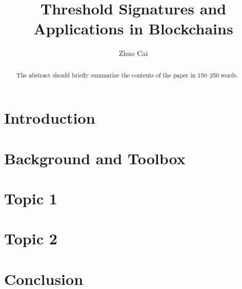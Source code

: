 \documentclass[runningheads]{llncs}
\begin{document}
%
\title{Threshold Signatures and Applications in Blockchains}
%
%
\author{Zhuo Cai}
%
%
%
\maketitle              %
%
\begin{abstract}
The abstract should briefly summarize the contents of the paper in
150--250 words.
\end{abstract}
%
%

\section{Introduction}
\cite{DBLP:conf/ccs/DasCXNB023}


\section{Background and Toolbox}


\section{Topic 1}


\section{Topic 2}


\section{Conclusion}







\end{document}
